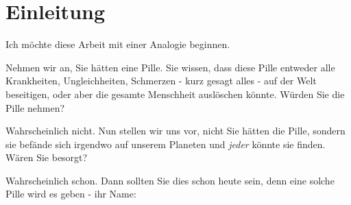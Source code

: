 \chapter{Einleitung}

Ich möchte diese Arbeit mit einer Analogie beginnen.

Nehmen wir an, Sie hätten eine Pille. Sie wissen, dass diese Pille entweder alle Krankheiten, Ungleichheiten, Schmerzen - kurz gesagt alles  - auf der Welt beseitigen, oder aber die gesamte Menschheit auslöschen könnte. Würden Sie die Pille nehmen?

Wahrscheinlich nicht. Nun stellen wir uns vor, nicht Sie hätten die Pille, sondern sie befände sich irgendwo auf unserem Planeten und \emph{jeder} könnte sie finden. Wären Sie besorgt?

Wahrscheinlich schon. Dann sollten Sie dies schon heute sein, denn eine solche Pille wird es geben - ihr Name:
